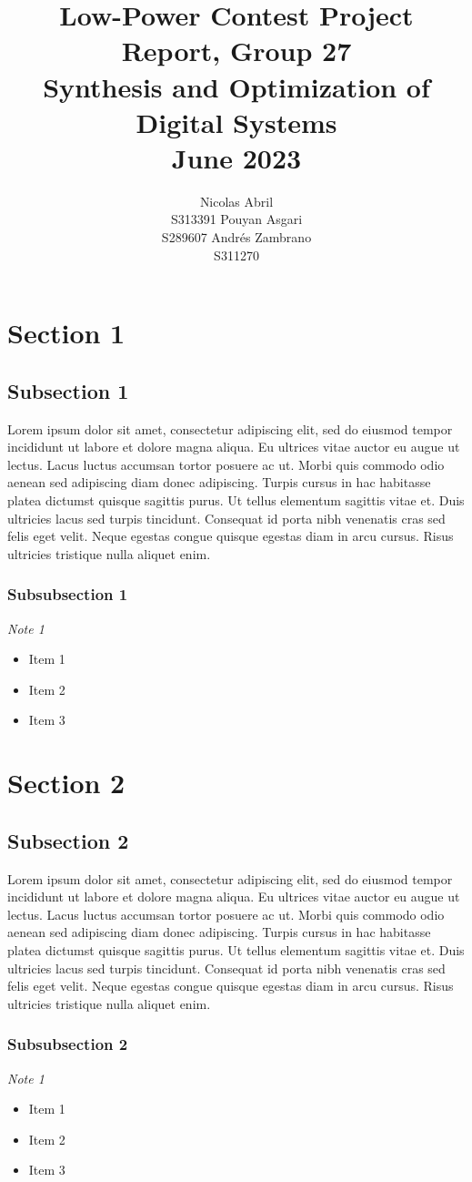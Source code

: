 \documentclass[11pt]{article}
\title{Low-Power Contest Project Report, Group 27\\Synthesis and Optimization of Digital Systems\\June 2023}
\author{Nicolas Abril \\ S313391 \And  
        Pouyan Asgari \\ S289607 \And
        Andrés Zambrano \\ S311270}
\begin{document}
\maketitle

\section{Section 1}

\subsection{Subsection 1}

Lorem ipsum dolor sit amet, consectetur adipiscing elit, sed do eiusmod tempor incididunt ut labore et dolore magna aliqua. Eu ultrices vitae auctor eu augue ut lectus. Lacus luctus accumsan tortor posuere ac ut. Morbi quis commodo odio aenean sed adipiscing diam donec adipiscing. Turpis cursus in hac habitasse platea dictumst quisque sagittis purus. Ut tellus elementum sagittis vitae et. Duis ultricies lacus sed turpis tincidunt. Consequat id porta nibh venenatis cras sed felis eget velit. Neque egestas congue quisque egestas diam in arcu cursus. Risus ultricies tristique nulla aliquet enim.

\subsubsection{Subsubsection 1}

\emph{Note 1}

\begin{itemize}[noitemsep]
  \item Item 1
  \item Item 2
  \item Item 3
\end{itemize}

\section{Section 2}

\subsection{Subsection 2}

Lorem ipsum dolor sit amet, consectetur adipiscing elit, sed do eiusmod tempor incididunt ut labore et dolore magna aliqua. Eu ultrices vitae auctor eu augue ut lectus. Lacus luctus accumsan tortor posuere ac ut. Morbi quis commodo odio aenean sed adipiscing diam donec adipiscing. Turpis cursus in hac habitasse platea dictumst quisque sagittis purus. Ut tellus elementum sagittis vitae et. Duis ultricies lacus sed turpis tincidunt. Consequat id porta nibh venenatis cras sed felis eget velit. Neque egestas congue quisque egestas diam in arcu cursus. Risus ultricies tristique nulla aliquet enim.

\subsubsection{Subsubsection 2}

\emph{Note 1}

\begin{itemize}[noitemsep]
  \item Item 1
  \item Item 2
  \item Item 3
\end{itemize}
\end{document}
